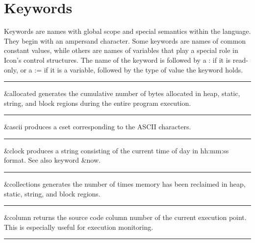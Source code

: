 \section{Keywords}

Keywords are names with global scope and special semantics within
the language. They begin with an ampersand character. Some keywords are names of
common constant values, while others are names of variables that play a special
role in Icon's control structures. The
name of the keyword is followed by a : if it is read-only, or a := if it is a
variable, followed by the type of value the keyword holds.

\bigskip\hrule\vspace{0.1cm}

\noindent
{}\textsf{\&allocated} generates the cumulative number
of bytes allocated in heap, static, string, and block regions during
the entire program execution.

\bigskip\hrule\vspace{0.1cm}

\noindent
{}\textsf{\&ascii} produces a cset corresponding to
the ASCII characters.

\bigskip\hrule\vspace{0.1cm}

\noindent
\textsf{\&clock} produces a string consisting of the current time of day in hh:mm:ss format. See also keyword
\textsf{\&now}.

\bigskip\hrule\vspace{0.1cm}

\noindent
{}\textsf{\&collections} generates the number of
times memory has been reclaimed in heap, static, string, and block
regions.

\bigskip\hrule\vspace{0.1cm}

\noindent
\textsf{\&column} returns the source code
column number of the current execution point. This
is especially useful for execution monitoring.

\bigskip\hrule\vspace{0.1cm}

